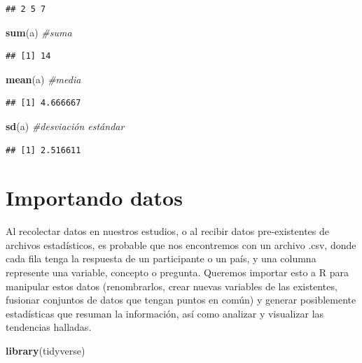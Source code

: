 \documentclass[
]{article}
\newenvironment{Shaded}{\begin{snugshade}}{\end{snugshade}}
\newcommand{\CommentTok}[1]{\textcolor[rgb]{0.56,0.35,0.01}{\textit{#1}}}
\newcommand{\FunctionTok}[1]{\textcolor[rgb]{0.13,0.29,0.53}{\textbf{#1}}}
\newcommand{\NormalTok}[1]{#1}
\begin{document}
\begin{verbatim}
## 2 5 7
\end{verbatim}

\begin{Shaded}
\begin{Highlighting}[]
\FunctionTok{sum}\NormalTok{(a) }\CommentTok{\#suma}
\end{Highlighting}
\end{Shaded}

\begin{verbatim}
## [1] 14
\end{verbatim}

\begin{Shaded}
\begin{Highlighting}[]
\FunctionTok{mean}\NormalTok{(a) }\CommentTok{\#media}
\end{Highlighting}
\end{Shaded}

\begin{verbatim}
## [1] 4.666667
\end{verbatim}

\begin{Shaded}
\begin{Highlighting}[]
\FunctionTok{sd}\NormalTok{(a) }\CommentTok{\#desviación estándar}
\end{Highlighting}
\end{Shaded}

\begin{verbatim}
## [1] 2.516611
\end{verbatim}

\section{Importando datos}\label{importando-datos}

Al recolectar datos en nuestros estudios, o al recibir datos
pre-existentes de archivos estadísticos, es probable que nos encontremos
con un archivo .csv, donde cada fila tenga la respuesta de un
participante o un país, y una columna represente una variable, concepto
o pregunta. Queremos importar esto a R para manipular estos datos
(renombrarlos, crear nuevas variables de las existentes, fusionar
conjuntos de datos que tengan puntos en común) y generar posiblemente
estadísticas que resuman la información, así como analizar y visualizar
las tendencias halladas.

\begin{Shaded}
\begin{Highlighting}[]
\FunctionTok{library}\NormalTok{(tidyverse)}
\end{Highlighting}
\end{Shaded}
\end{document}
